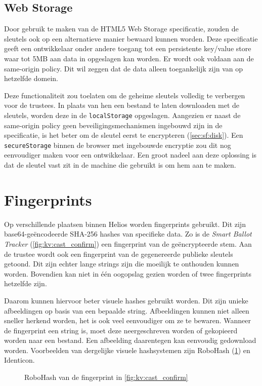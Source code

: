 \subsection{Web Storage~\cite{hickson_web_storage}\cite{site:pilgrim_local_storage}}
\label{sec:sf:web_storage}

Door gebruik te maken van de HTML5 Web Storage specificatie, zouden de sleutels ook op een alternatieve manier bewaard kunnen worden. Deze specificatie geeft een ontwikkelaar onder andere toegang tot een persistente key/value store waar tot 5MB aan data in opgeslagen kan worden. Er wordt ook voldaan aan de same-origin policy. Dit wil zeggen dat de data alleen toegankelijk zijn van op hetzelfde domein.\cite{gollman_computer_security}

\npar Deze functionaliteit zou toelaten om de geheime sleutels volledig te verbergen voor de trustees. In plaats van hen een bestand te laten downloaden met de sleutels, worden deze in de \texttt{localStorage} opgeslagen. Aangezien er naast de same-origin policy geen beveiligingsmechanismen ingebouwd zijn in de specificatie, is het beter om de sleutel eerst te encrypteren (\ref{sec:sf:disk}). Een \texttt{secureStorage} binnen de browser met ingebouwde encryptie zou dit nog eenvoudiger maken voor een ontwikkelaar.\cite{site:zakas_securestore} Een groot nadeel aan deze oplossing is dat de sleutel vast zit in de machine die gebruikt is om hem aan te maken.

\section{Fingerprints}
\label{sec:sf:fingerprints}


Op verschillende plaatsen binnen Helios worden fingerprints gebruikt. Dit zijn base64-ge\"encodeerde SHA-256 hashes van specifieke data. Zo is de \textit{Smart Ballot Tracker} (\ref{fig:kv:cast_confirm}) een fingerprint van de ge\"encrypteerde stem. Aan de trustee wordt ook een fingerprint van de gegenereerde publieke sleutels getoond. Dit zijn echter lange strings zijn die moeilijk te onthouden kunnen worden. Bovendien kan niet in \'e\'en oogopslag gezien worden of twee fingerprints hetzelfde zijn.

\npar Daarom kunnen hiervoor beter visuele hashes gebruikt worden. Dit zijn unieke afbeeldingen op basis van een bepaalde string. Afbeeldingen kunnen niet alleen sneller herkend worden, het is ook veel eenvoudiger om ze te bewaren. Wanneer de fingerprint een string is, moet deze neergeschreven worden of gekopieerd worden naar een bestand. Een afbeelding daarentegen kan eenvoudig gedownload worden. Voorbeelden van dergelijke visuele hashsystemen zijn RoboHash (\ref{fig:sf:robohash}) en Identicon.\cite{site:robohash}\cite{wiki:identicon}

\begin{figure}
  \caption{RoboHash van de fingerprint in \ref{fig:kv:cast_confirm}}
  \label{fig:sf:robohash}
\end{figure}
